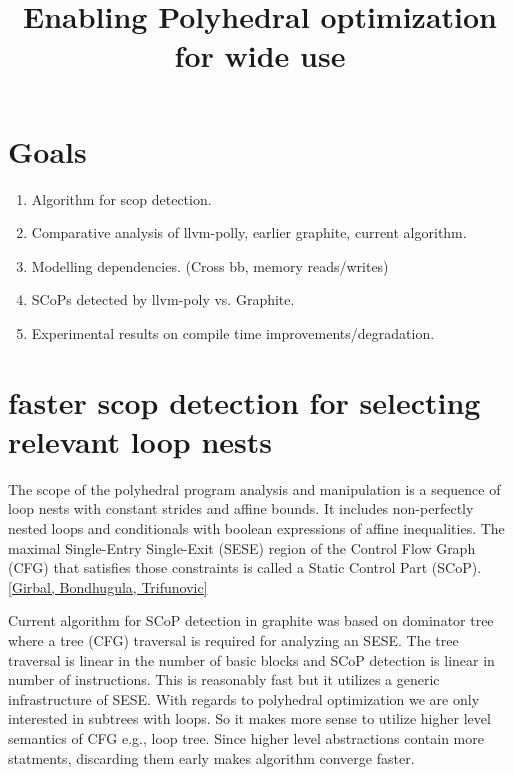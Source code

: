 \title{Enabling Polyhedral optimization for wide use}


\section{Goals}
\begin{enumerate}

  \item Algorithm for scop detection.
  \item Comparative analysis of llvm-polly, earlier graphite, current algorithm.
  \item Modelling dependencies. (Cross bb, memory reads/writes)
  \item SCoPs detected by llvm-poly vs. Graphite.
  \item Experimental results on compile time improvements/degradation.

\end{enumerate}


\section{faster scop detection for selecting relevant loop nests}
The scope of the polyhedral program analysis and manipulation is a sequence of loop
nests with constant strides and affine bounds. It includes non-perfectly nested loops
and conditionals with boolean expressions of affine inequalities.
The maximal Single-Entry Single-Exit (SESE) region of the Control Flow Graph
(CFG) that satisfies those constraints is called a Static Control Part (SCoP). \ref{Girbal, Bondhugula, Trifunovic}

Current algorithm for SCoP detection in graphite was based on dominator tree where a tree (CFG) traversal is required
for analyzing an SESE. The tree traversal is linear in the number of basic blocks and SCoP detection is linear in
number of instructions. This is reasonably fast but it utilizes a generic infrastructure of SESE. With regards to
polyhedral optimization we are only interested in subtrees with loops. So it makes more sense to utilize higher level
semantics of CFG e.g., loop tree. Since higher level abstractions contain more statments, discarding them early
makes algorithm converge faster.

